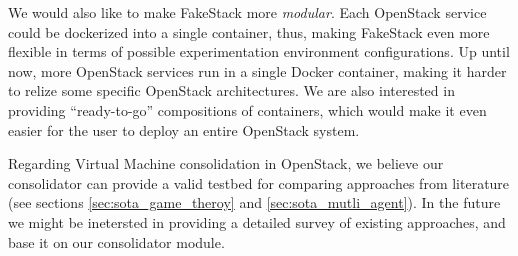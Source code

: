 We would also like to make FakeStack more \emph{modular}. Each OpenStack service could be dockerized into a single container, thus, making FakeStack even more flexible in terms of possible experimentation environment configurations. Up until now, more OpenStack services run in a single Docker container, making it harder to relize some specific OpenStack architectures. We are also interested in providing ``ready-to-go'' compositions of containers, which would make it even easier for the user to deploy an entire OpenStack system.

Regarding Virtual Machine consolidation in OpenStack, we believe our consolidator can provide a valid testbed for comparing approaches from literature (see sections \ref{sec:sota_game_theroy} and \ref{sec:sota_mutli_agent}). In the future we might be inetersted in providing a detailed survey of existing approaches, and base it on our consolidator module.
